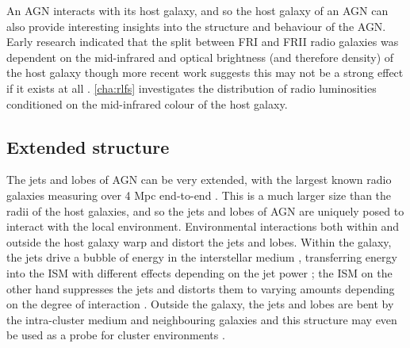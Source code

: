         An AGN interacts with its host galaxy, and so the host galaxy of an AGN can also provide interesting insights into the structure and behaviour of the AGN. Early research indicated that the split between FRI and FRII radio galaxies was dependent on the mid-infrared and optical brightness (and therefore density) of the host galaxy \citep{ledlow_20_1996,bicknell_relativistic_1995} though more recent work suggests this may not be a strong effect if it exists at all \citep{hardcastle20feedback}. \autoref{cha:rlfs} investigates the distribution of radio luminosities conditioned on the mid-infrared colour of the host galaxy.

    \subsection{Extended structure}
    \label{sec:extended-structure-of-agn}

        The jets and lobes of AGN can be very extended, with the largest known radio galaxies measuring over 4 Mpc end-to-end \citep{machalski_understanding_2011}. This is a much larger size than the radii of the host galaxies, and so the jets and lobes of AGN are uniquely posed to interact with the local environment. Environmental interactions both within and outside the host galaxy warp and distort the jets and lobes. Within the galaxy, the jets drive a bubble of energy in the interstellar medium \citep[ISM;][]{mukherjee_relativistic_2016}, transferring energy into the ISM with different effects depending on the jet power \citep{mukherjee_relativistic_2018}; the ISM on the other hand suppresses the jets and distorts them to varying amounts depending on the degree of interaction \citep{mukherjee_relativistic_2018}. Outside the galaxy, the jets and lobes are bent by the intra-cluster medium and neighbouring galaxies \citep[ICM;][]{garon19bending,rodman19asymmetry} and this structure may even be used as a probe for cluster environments \citep{banfield_radio_2016,sakelliou_3c40_2008}.

